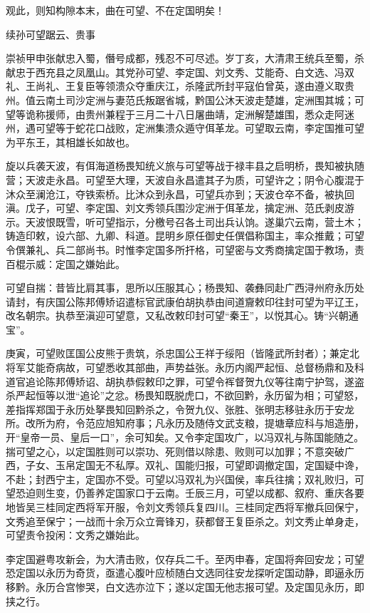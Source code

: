 \documentclass[]{article}
\begin{document}
观此，则知构隙本末，曲在可望、不在定国明矣！

续孙可望踞云、贵事

崇祯甲申张献忠入蜀，僭号成都，残忍不可尽述。岁丁亥，大清肃王统兵至蜀，杀献忠于西充县之凤凰山。其党孙可望、李定国、刘文秀、艾能奇、白文选、冯双礼、王尚礼、王复臣等领溃众夺重庆江，杀隆武所封平寇伯曾英，遂由遵义取贵州。值云南土司沙定洲与妻范氏叛踞省城，黔国公沐天波走楚雄，定洲围其城；可望等诡称援师，由贵州兼程于三月二十八日屠曲靖，定洲解楚雄围，悉众走阿迷州，遇可望等于蛇花口战败，定洲集溃众遁守佴革龙。可望取云南，李定国推可望为平东王，其相雄长如故也。

旋以兵袭天波，有佴海道杨畏知统义旅与可望等战于禄丰县之启明桥，畏知被执随营；天波走永昌。可望至大理，天波自永昌遣其子为质，可望许之；阴令心腹混于沐众至澜沧江，夺铁索桥。比沐众到永昌，可望兵亦到；天波仓卒不备，被执回滇。戊子，可望、李定国、刘文秀领兵围沙定洲于佴革龙，擒定洲、范氏剥皮游示。天波恨既雪，听可望指示，分檄号召各土司出兵认饷。遂巢穴云南，营土木；铸造印敕，设六部、九卿、科道。昆明乡原任御史任僎倡称国主，率众推戴；可望令僎兼礼、兵二部尚书。时惟李定国多所扞格，可望密与文秀商擒定国于教场，责百棍示威：定国之嫌始此。

可望自揣：昔皆比肩其事，思所以压服其心；杨畏知、袭彝同赴广西浔州府永历处请封，有庆国公陈邦傅矫诏遣标官武康伯胡执恭由间道齎敕印往封可望为平辽王，改名朝宗。执恭至滇迎可望意，又私改敕印封可望``秦王''，以悦其心。铸``兴朝通宝''。

庚寅，可望败匡国公皮熊于贵筑，杀忠国公王祥于绥阳（皆隆武所封者）；兼定北将军艾能奇病故，可望悉收其部曲，声势益张。永历内阁严起恒、总督杨鼎和及科道官追论陈邦傅矫诏、胡执恭假敕印之罪，可望令裈督贺九仪等往南宁护驾，遂盗杀严起恒等以泄``追论''之忿。杨畏知既脱虎口，不欲回黔，永历留为相；可望怒，差指挥郑国于永历处拏畏知回黔杀之，令贺九仪、张胜、张明志移驻永历于安龙所。改所为府，令范应旭知府事；凡永历及随侍文武支粮，提塘章应科与旭造册，开``皇帝一员、皇后一口''，余可知矣。又令李定国攻广，以冯双礼与陈国能随之。揣可望之心，以定国胜则可以崇功、死则借以除患、败则可以加罪；不意突破广西，子女、玉帛定国无不私厚。双礼、国能归报，可望即调撤定国，定国疑中谗，不赴；封西宁主，定国亦不受。可望以冯双礼为兴国侯，率兵往擒；双礼败归，可望恐迫则生变，仍善养定国家口于云南。壬辰三月，可望以成都、叙府、重庆各要地皆吴三桂同定西将军开服，令刘文秀领兵复四川。三桂同定西将军撤兵回保宁，文秀追至保宁；一战而十余万众立膏锋刃，获都督王复臣杀之。刘文秀止单身走，可望责令投闲：文秀之嫌始此。

李定国避粤攻新会，为大清击败，仅存兵二千。至丙申春，定国将奔回安龙；可望恐定国以永历为奇货，亟遣心腹叶应桢随白文选同往安龙探听定国动静，即逼永历移黔。永历合宫惨哭，白文选亦泣下；遂以定国无他志报可望。及定国见永历，即挟之行。
\end{document}
